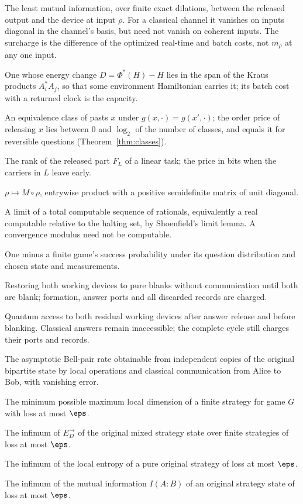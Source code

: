 \begin{description}[leftmargin=!,labelwidth=3.6cm,style=nextline,itemsep=2pt]
\item[Correlation term $m_\rho$] The least mutual information, over finite exact dilations, between the released output and the device at input $\rho$. For a classical channel it vanishes on inputs diagonal in the channel's basis, but need not vanish on coherent inputs. The surcharge is the difference of the optimized real-time and batch costs, not $m_\rho$ at any one input.
\item[Balanced channel] One whose energy change $D=\Phi^*(H)-H$ lies in the span of the Kraus products $A_i^*A_j$, so that some environment Hamiltonian carries it; its batch cost with a returned clock is the capacity.
\item[Continuation class] An equivalence class of pasts $x$ under $g(x,\cdot)=g(x',\cdot)$; the order price of releasing $x$ lies between $0$ and $\log_2$ of the number of classes, and equals it for reversible questions (Theorem~\ref{thm:classes}).
\item[Release rank] The rank of the released part $F_L$ of a linear task; the price in bits when the carriers in $L$ leave early.
\item[Generalized dephasing (Schur) channel] $\rho\mapsto M\circ\rho$, entrywise product with a positive semidefinite matrix of unit diagonal.
\item[Limit-computable ($\Delta^0_2$) real] A limit of a total computable sequence of rationals, equivalently a real computable relative to the halting set, by Shoenfield's limit lemma. A convergence modulus need not be computable.
\item[Game loss] One minus a finite game's success probability under its question distribution and chosen state and measurements.
\item[Local reset] Restoring both working devices to pure blanks without communication until both are blank; formation, answer ports and all discarded records are charged.
\item[Joint reset (reunion)] Quantum access to both residual working devices after answer release and before blanking. Classical answers remain inaccessible; the complete cycle still charges their ports and records.
\item[One-way distillable entanglement $E_D^{\to}$] The asymptotic Bell-pair rate obtainable from independent copies of the original bipartite state by local operations and classical communication from Alice to Bob, with vanishing error.
\item[Dimension demand $D_G(\eps)$] The minimum possible maximum local dimension of a finite strategy for game $G$ with loss at most $\eps$.
\item[Usable demand $d_G(\eps)$] The infimum of $E_D^{\to}$ of the original mixed strategy state over finite strategies of loss at most $\eps$.
\item[Pure demand $E_G(\eps)$] The infimum of the local entropy of a pure original strategy of loss at most $\eps$.
\item[Correlation demand $C_G(\eps)$] The infimum of the mutual information $I(A:B)$ of an original strategy state of loss at most $\eps$.
\end{description}

